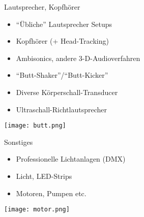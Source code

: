 \begin{frame}{Lautsprecher, Kopfhörer}
\begin{itemize}
	\item "`Übliche"' Lautsprecher Setups
	\item Kopfhörer (+ Head-Tracking)
	\item Ambisonics, andere 3-D-Audioverfahren
	\item "`Butt-Shaker"'/"`Butt-Kicker"'
	\item Diverse Körperschall-Transducer
	\item Ultraschall-Richtlautsprecher
\end{itemize}

\begin{center}
\texttt{[image: butt.png]}
\end{center}

\end{frame}

\begin{frame}{Sonstiges}
\begin{itemize}
	\item Professionelle Lichtanlagen (DMX)
	\item Licht, LED-Strips
	\item Motoren, Pumpen etc.
\end{itemize}

\begin{center}
\texttt{[image: motor.png]}
\end{center}
\end{frame}

